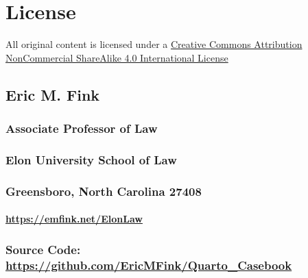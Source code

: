 \documentclass[11pt,letterpaper,twoside]{article}
\begin{document}
\chapter*{License}\label{license}


{ 
 }

All original content is licensed under a
\href{https://creativecommons.org/licenses/by-nc-sa/4.0/}{Creative
Commons Attribution NonCommercial ShareAlike 4.0 International License}

\section*{Eric M. Fink}\label{eric-m.-fink}


\subsection*{Associate Professor of
Law}\label{associate-professor-of-law}

\subsection*{Elon University School of
Law}\label{elon-university-school-of-law}

\subsection*{Greensboro, North Carolina
27408}\label{greensboro-north-carolina-27408}

\subsubsection*{\texorpdfstring{\href{https://emfink.net/ElonLaw/}{https://emfink.net/ElonLaw}}{https://emfink.net/ElonLaw}}\label{httpsemfink.netelonlaw}

\subsection*{\texorpdfstring{Source Code:
\href{https://github.com/EricMFink/Quarto_Casebook}{https://github.com/EricMFink/Quarto\_Casebook}}{Source Code: https://github.com/EricMFink/Quarto\_Casebook}}\label{source-code-httpsgithub.comericmfink}
\end{document}
